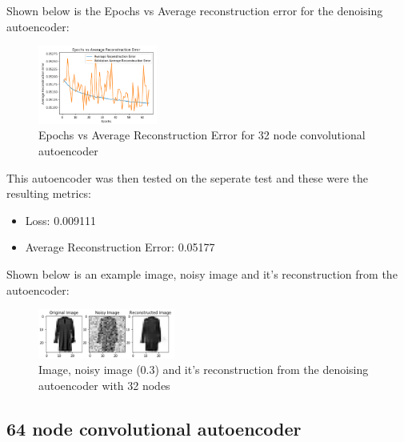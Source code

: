 \documentclass[conference]{IEEEtran}
\begin{document}
    Shown below is the Epochs vs Average reconstruction error for the denoising autoencoder:

    \begin{figure}[H]
        \centering
        \captionsetup{justification=centering}
        \centering
            \includegraphics[width=0.35\textwidth]{31.png}
            \caption{Epochs vs Average Reconstruction Error for 32 node convolutional autoencoder}
    \end{figure}

    This autoencoder was then tested on the seperate test and these were the resulting metrics:

    \begin{itemize}
        \item Loss: 0.009111
        \item Average Reconstruction Error: 0.05177\\
    \end{itemize}

    Shown below is an example image, noisy image and it's reconstruction from the autoencoder:

    \begin{figure}[H]
        \centering
        \captionsetup{justification=centering}
        \centering
            \includegraphics[width=0.4\textwidth]{32.png}
            \caption{Image, noisy image (0.3) and it's reconstruction from the denoising autoencoder with 32 nodes}
    \end{figure}













    \subsection{64 node convolutional autoencoder}
\end{document}
